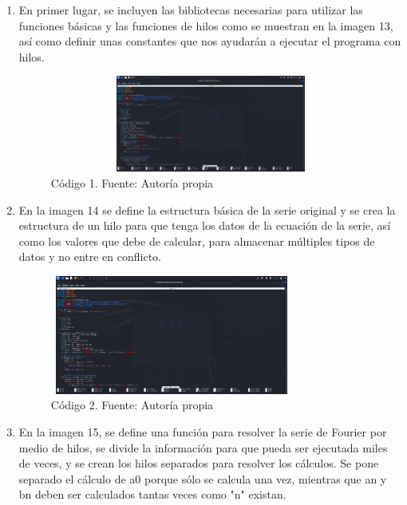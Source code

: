 \begin{enumerate} 
	\def\labelenumi{\arabic{enumi}.} 
	\item En primer lugar, se incluyen las bibliotecas necesarias para utilizar las funciones básicas y las funciones de hilos como se muestran en la imagen 13, así como definir unas constantes que nos ayudarán a ejecutar el programa con hilos.
	
	\begin{figure}[H]
		\centering
		\includegraphics[width=4.53385in,height=1.24967in]{media/image4.png}
		\caption{Código 1. Fuente: Autoría propia}
	\end{figure}
	
	\item En la imagen 14 se define la estructura básica de la serie original y se crea la estructura de un hilo para que tenga los datos de la ecuación de la serie, así como los valores que debe de calcular, para almacenar múltiples tipos de datos y no entre en conflicto.
	
	\begin{figure}[H]
		\centering
		\includegraphics[width=3.15in,height=1.54172in]{media/image4.png}
		\caption{Código 2. Fuente: Autoría propia}
	\end{figure}
	
	\item En la imagen 15, se define una función para resolver la serie de Fourier por medio de hilos, se divide la información para que pueda ser ejecutada miles de veces, y se crean los hilos separados para resolver los cálculos. Se pone separado el cálculo de a0 porque sólo se calcula una vez, mientras que an y bn deben ser calculados tantas veces como "n" existan.
	

\end{enumerate}

